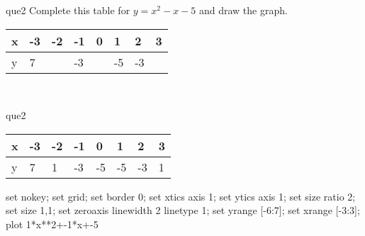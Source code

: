 \documentclass[13.5pt, varwidth=true]{beamer}
\begin{document}
\begin{frame}[shrink=19,fragile]
	\begin{beamercolorbox}[rounded=true, left, shadow=true,wd=14.8cm]{que2}
		 Complete this table for $y = x^{2} - x - 5$ and draw the graph. \\[0.3cm] \renewcommand{\arraystretch}{1.2}\begin{tabular}{|C|C|C|C|C|C|C|C|} \hline x & -3 & -2 & -1 & 0 & 1 & 2 & 3 \\ \hline y & 7 &  & -3 &  & -5 & -3 & \\ \hline \end{tabular}\\[0.3cm]
	\end{beamercolorbox}
\end{frame}
\begin{frame}[shrink=19,fragile]
	\begin{beamercolorbox}[rounded=true, left, shadow=true,wd=14.8cm]{que2}
 		\renewcommand{\arraystretch}{1.2}\begin{tabular}{|C|C|C|C|C|C|C|C|} \hline x & -3 & -2 & -1 & 0 & 1 & 2 & 3 \\ \hline y & 7 & 1 & -3 & -5 & -5 & -3 & 1\\ \hline \end{tabular}\begin{gnuplot}[terminal=pdf] set nokey; set grid; set border 0; set xtics axis 1; set ytics axis 1; set size ratio 2; set size 1,1; set zeroaxis linewidth 2 linetype 1; set yrange [-6:7]; set xrange [-3:3]; plot 1*x**2+-1*x+-5 \end{gnuplot}
	\end{beamercolorbox}
\end{frame}
\end{document}
